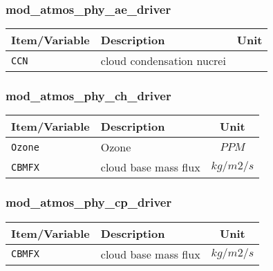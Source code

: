 

\subsubsection{mod\_atmos\_phy\_ae\_driver}
 \begin{tabularx}{150mm}{|l|X|c|} \hline
 \rowcolor[gray]{0.9} Item/Variable & Description  & Unit \\ \hline
    \verb|CCN| & cloud condensation nucrei &   \\ \hline
 \end{tabularx}

\subsubsection{mod\_atmos\_phy\_ch\_driver}
 \begin{tabularx}{150mm}{|l|X|c|} \hline
 \rowcolor[gray]{0.9} Item/Variable & Description  & Unit \\ \hline
  \verb|Ozone| & Ozone & $PPM$  \\\hline
  \verb|CBMFX| & cloud base mass flux & $kg/m2/s$ \\\hline
 \end{tabularx}

\subsubsection{mod\_atmos\_phy\_cp\_driver}
 \begin{tabularx}{150mm}{|l|X|c|} \hline
 \rowcolor[gray]{0.9} Item/Variable & Description  & Unit \\ \hline
  \verb|CBMFX| & cloud base mass flux & $kg/m2/s$ \\\hline
 \end{tabularx}

